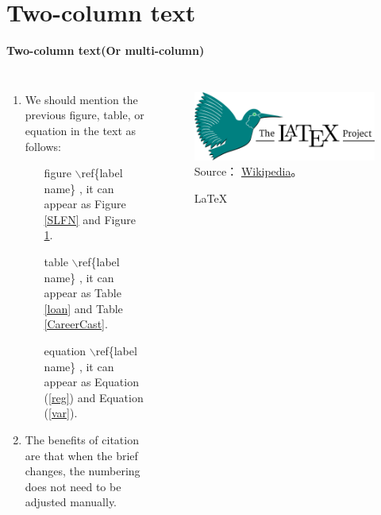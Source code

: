 \documentclass[12pt, aspectratio=169]{beamer}
\begin{document}
\section{Two-column text}
\linespread{1}  
\begin{frame}{\textbf{Two-column text(Or multi-column)}}
\linespread{1.5} 

	\begin{columns}[c]
			\begin{enumerate}[]
				\item We should mention the previous figure, table, or equation in the text as follows:
				\begin{enumerate}[]
					\item [figure $\backslash$ref\{label name\}],
					     it can appear as Figure \ref{SLFN} and Figure \ref{LaTeX}.
					\item [table $\backslash$ref\{label name\}],
						it can appear as Table \ref{loan} and Table \ref{CareerCast}.
					\item [equation $\backslash$ref\{label name\}],
						it can appear as Equation (\ref{reg}) and Equation (\ref{var}).
				\end{enumerate}
				\item The benefits of citation are that when the brief changes, the numbering does not need to be adjusted manually.
			\end{enumerate}

			\begin{figure}
				\includegraphics[scale=0.045]{Fig/LaTeX.png}\\
				\scriptsize{Source：
				\href{https://en.wikipedia.org/wiki/LaTeX}{Wikipedia}。}\\
				\caption{\LaTeX}
				\label{LaTeX} 
			\end{figure}
	\end{columns}
\end{frame}


\end{document}
